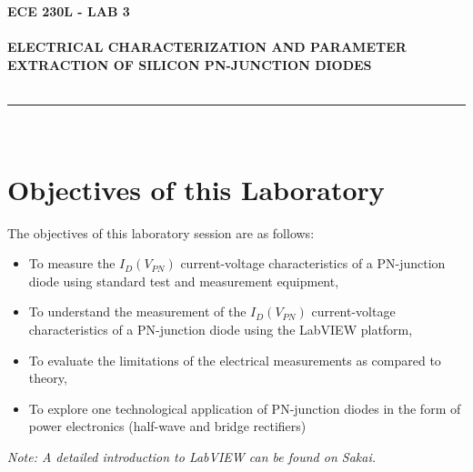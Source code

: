 \documentclass[12pt]{../manual}
\begin{document}
\begin{center}
\textbf{\huge ECE 230L - LAB 3}\\~\\
\textbf{\large ELECTRICAL CHARACTERIZATION AND PARAMETER EXTRACTION OF SILICON PN-JUNCTION DIODES}\\~\\
\rule{6.5in}{0.5mm}\\
\end{center}

\tableofcontents

\listoffigures

\newpage
%
\section{Objectives of this Laboratory}
The objectives of this laboratory session are as follows:
\begin{itemize}
\item To measure the $I_D(V_{PN})$ current-voltage characteristics of a PN-junction diode using standard test and measurement equipment,
\item To understand the measurement of the $I_D(V_{PN})$ current-voltage characteristics of a PN-junction diode using the LabVIEW platform,
\item To evaluate the limitations of the electrical measurements as compared to theory,
\item To explore one technological application of PN-junction diodes in the form of power electronics (half-wave and bridge rectifiers)
\end{itemize}
\textit{Note: A detailed introduction to LabVIEW can be found on Sakai.}
\end{document}
